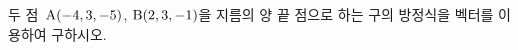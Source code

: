 두 점~$\mathrm{A}(-4{,}\mkern3mu\mathopen{}3{,}\mkern3mu\mathopen{}-5)$, $\mathrm{B}(2{,}\mkern3mu\mathopen{}3{,}\mkern3mu\mathopen{}-1)$을 지름의 양 끝 점으로 하는 구의 방정식을 벡터를 이용하여 구하시오.
